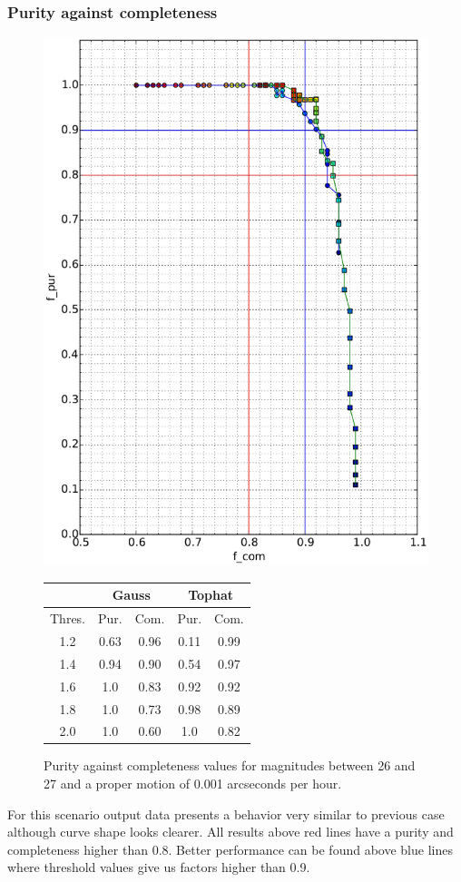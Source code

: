 \documentclass{article}
\begin{document}
\subsubsection{Purity against completeness}
\begin{figure}[H]
\centering
\includegraphics[width=.55\linewidth]{images/26_27_0_f.eps}
\qquad
\begin{tabular}[b]{|c|c|c|c|c|}\hline
\multicolumn{1}{|c|}{} & \multicolumn{2}{c|}{Gauss} & \multicolumn{2}{c|}{Tophat} \\
\hline \hline
Thres. & Pur. & Com. & Pur. & Com.\\
\hline
1.2 & 0.63 & 0.96 & 0.11 & 0.99\\
\hline
1.4 & 0.94 & 0.90 & 0.54 & 0.97\\
\hline
1.6 & 1.0 & 0.83 & 0.92 & 0.92\\
\hline
1.8 & 1.0 & 0.73 & 0.98 & 0.89\\
\hline
2.0 & 1.0 & 0.60 & 1.0 & 0.82\\
\hline
\end{tabular}
\captionsetup{labelformat=andtable}
\caption{Purity against completeness values for magnitudes between 26 and 27 and a proper motion of 0.001 arcseconds per hour.}
\end{figure}

For this scenario output data presents a behavior very similar to previous case although curve shape looks clearer.
All results above red lines have a purity and completeness higher than 0.8. Better performance can be found above blue lines where threshold values give us factors higher than 0.9.
\end{document}
